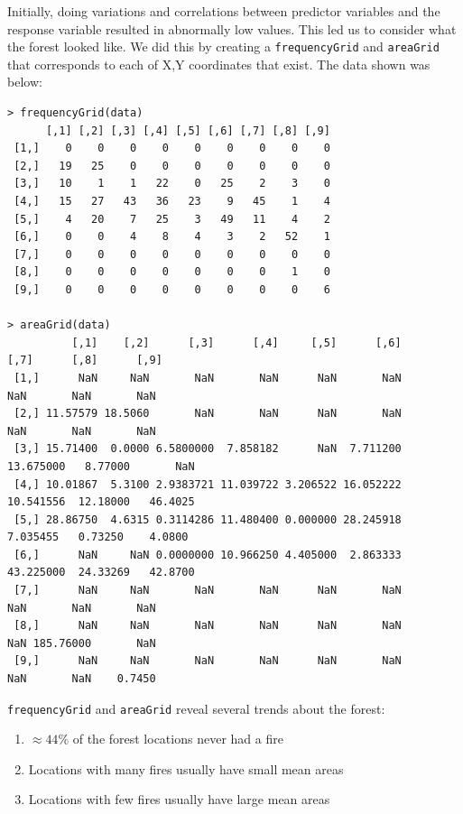 \documentclass{article}
\begin{document}
Initially, doing variations and correlations between predictor variables and the response
variable resulted in abnormally low values. This led us to consider what the forest looked like.
We did this by creating a \verb+frequencyGrid+ and \verb+areaGrid+ that corresponds to each
of X,Y coordinates that exist. The data shown was below:

\begin{verbatim}
> frequencyGrid(data)
      [,1] [,2] [,3] [,4] [,5] [,6] [,7] [,8] [,9]
 [1,]    0    0    0    0    0    0    0    0    0
 [2,]   19   25    0    0    0    0    0    0    0
 [3,]   10    1    1   22    0   25    2    3    0
 [4,]   15   27   43   36   23    9   45    1    4
 [5,]    4   20    7   25    3   49   11    4    2
 [6,]    0    0    4    8    4    3    2   52    1
 [7,]    0    0    0    0    0    0    0    0    0
 [8,]    0    0    0    0    0    0    0    1    0
 [9,]    0    0    0    0    0    0    0    0    6

> areaGrid(data)
          [,1]    [,2]      [,3]      [,4]     [,5]      [,6]      [,7]      [,8]      [,9]
 [1,]      NaN     NaN       NaN       NaN      NaN       NaN       NaN       NaN       NaN
 [2,] 11.57579 18.5060       NaN       NaN      NaN       NaN       NaN       NaN       NaN
 [3,] 15.71400  0.0000 6.5800000  7.858182      NaN  7.711200 13.675000   8.77000       NaN
 [4,] 10.01867  5.3100 2.9383721 11.039722 3.206522 16.052222 10.541556  12.18000   46.4025
 [5,] 28.86750  4.6315 0.3114286 11.480400 0.000000 28.245918  7.035455   0.73250    4.0800
 [6,]      NaN     NaN 0.0000000 10.966250 4.405000  2.863333 43.225000  24.33269   42.8700
 [7,]      NaN     NaN       NaN       NaN      NaN       NaN       NaN       NaN       NaN
 [8,]      NaN     NaN       NaN       NaN      NaN       NaN       NaN 185.76000       NaN
 [9,]      NaN     NaN       NaN       NaN      NaN       NaN       NaN       NaN    0.7450
\end{verbatim}

\verb+frequencyGrid+ and \verb+areaGrid+ reveal several trends about the forest:

\begin{enumerate}
	\item $\approx 44\%$ of the forest locations never had a fire
	\item Locations with many fires usually have small mean areas
	\item Locations with few fires usually have large mean areas
\end{enumerate}
\end{document}
